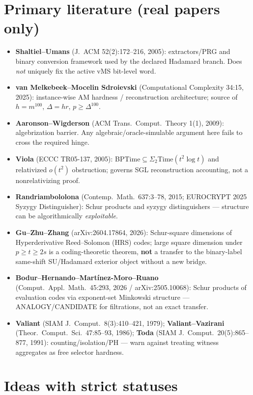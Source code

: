 \documentclass[11pt]{article}
\begin{document}
\section*{Primary literature (real papers only)}
\begin{itemize}
\item \textbf{Shaltiel--Umans} (J.~ACM 52(2):172--216, 2005): extractors/PRG and binary conversion
framework used by the declared Hadamard branch. Does \emph{not} uniquely fix the active vMS bit-level word.
\item \textbf{van Melkebeek--Mocelin Sdroievski} (Computational Complexity 34:15, 2025): instance-wise
AM hardness / reconstruction architecture; source of $h=m^{100}$, $\Delta=hr$, $p\ge\Delta^{100}$.
\item \textbf{Aaronson--Wigderson} (ACM Trans.\ Comput.\ Theory 1(1), 2009): algebrization barrier.
Any algebraic/oracle-simulable argument here fails to cross the required hinge.
\item \textbf{Viola} (ECCC TR05-137, 2005): BPTime$\subseteq\Sigma_2$Time$(t^2\log t)$ and relativized
$o(t^2)$ obstruction; governs SGL reconstruction accounting, not a nonrelativizing proof.
\item \textbf{Randriambololona} (Contemp.\ Math.\ 637:3--78, 2015; EUROCRYPT 2025 Syzygy Distinguisher):
Schur products and syzygy distinguishers --- structure can be algorithmically \emph{exploitable}.
\item \textbf{Gu--Zhu--Zhang} (arXiv:2604.17864, 2026): Schur-square dimensions of Hyperderivative
Reed--Solomon (HRS) codes; large square dimension under $p\ge t\ge 2s$ is a coding-theoretic theorem,
\textbf{not} a transfer to the binary-label same-shift SU/Hadamard exterior object without a new bridge.
\item \textbf{Bodur--Hernando--Mart\'inez-Moro--Ruano} (Comput.\ Appl.\ Math.\ 45:293, 2026 /
arXiv:2505.10068): Schur products of evaluation codes via exponent-set Minkowski structure ---
ANALOGY/CANDIDATE for filtrations, not an exact transfer.
\item \textbf{Valiant} (SIAM J.\ Comput.\ 8(3):410--421, 1979); \textbf{Valiant--Vazirani}
(Theor.\ Comput.\ Sci.\ 47:85--93, 1986); \textbf{Toda} (SIAM J.\ Comput.\ 20(5):865--877, 1991):
counting/isolation/PH --- warn against treating witness aggregates as free selector hardness.
\end{itemize}

\section*{Ideas with strict statuses}
\end{document}
